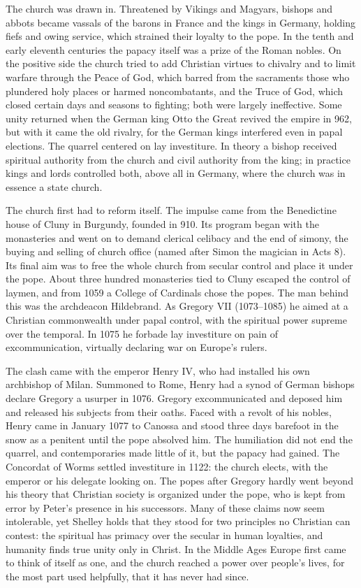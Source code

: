 The church was drawn in. Threatened by Vikings and Magyars, bishops and abbots became vassals of the
barons in France and the kings in Germany, holding fiefs and owing service, which strained their
loyalty to the pope. In the tenth and early eleventh centuries the papacy itself was a prize of the
Roman nobles. On the positive side the church tried to add Christian virtues to chivalry and to limit
warfare through the Peace of God, which barred from the sacraments those who plundered holy places or
harmed noncombatants, and the Truce of God, which closed certain days and seasons to fighting; both
were largely ineffective. Some unity returned when the German king Otto the Great revived the empire
in 962, but with it came the old rivalry, for the German kings interfered even in papal elections.
The quarrel centered on lay investiture. In theory a bishop received spiritual authority from the
church and civil authority from the king; in practice kings and lords controlled both, above all in
Germany, where the church was in essence a state church.

The church first had to reform itself. The impulse came from the Benedictine house of Cluny in
Burgundy, founded in 910. Its program began with the monasteries and went on to demand clerical
celibacy and the end of simony, the buying and selling of church office (named after Simon the
magician in Acts 8). Its final aim was to free the whole church from secular control and place it
under the pope. About three hundred monasteries tied to Cluny escaped the control of laymen, and from 1059 a College of Cardinals chose the popes. The man behind this was the archdeacon Hildebrand. As
Gregory VII (1073--1085) he aimed at a Christian commonwealth under papal control, with the spiritual
power supreme over the temporal. In 1075 he forbade lay investiture on pain of excommunication,
virtually declaring war on Europe's rulers.

The clash came with the emperor Henry IV, who had installed his own archbishop of Milan. Summoned to
Rome, Henry had a synod of German bishops declare Gregory a usurper in 1076. Gregory excommunicated
and deposed him and released his subjects from their oaths. Faced with a revolt of his nobles, Henry
came in January 1077 to Canossa and stood three days barefoot in the snow as a penitent until the pope
absolved him. The humiliation did not end the quarrel, and contemporaries made little of it, but the
papacy had gained. The Concordat of Worms settled investiture in 1122: the church elects, with the emperor or his delegate looking on. The popes after Gregory hardly went beyond his theory that
Christian society is organized under the pope, who is kept from error by Peter's presence in his
successors. Many of these claims now seem intolerable, yet Shelley holds that they stood for two
principles no Christian can contest: the spiritual has primacy over the secular in human loyalties,
and humanity finds true unity only in Christ. In the Middle Ages Europe first came to think of itself as one, and the church reached a power over people's lives, for the most part used helpfully, that
it has never had since.

